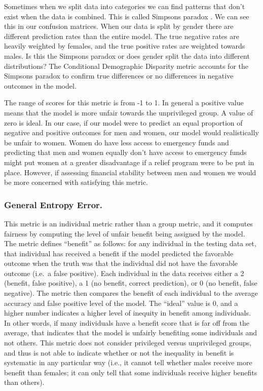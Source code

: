 \documentclass[water,article,submit,moreauthors,pdftex]{mdpi}
\begin{document}
Sometimes when we split data into categories we can find patterns that
don't exist when the data is combined. This is called Simpsons paradox
\citep{mehrabi2021survey}. We can see this in our confusion matrices.
When our data is split by gender there are different prediction rates
than the entire model. The true negative rates are heavily weighted by
females, and the true positive rates are weighted towards males. Is this
the Simpsons paradox or does gender split the data into different
distributions? The Conditional Demographic Disparity metric accounts for
the Simpsons paradox to confirm true differences or no differences in
negative outcomes in the model.

The range of scores for this metric is from -1 to 1. In general a
positive value means that the model is more unfair towards the
unprivileged group. A value of zero is ideal. In our case, if our model
were to predict an equal proportion of negative and positive outcomes
for men and women, our model would realistically be unfair to women.
Women do have less access to emergency funds and predicting that men and
women equally don't have access to emergency funds might put women at a
greater disadvantage if a relief program were to be put in place.
However, if assessing financial stability between men and women we would
be more concerned with satisfying this metric.

\hypertarget{general-entropy-error.}{%
\subsubsection{General Entropy Error.}\label{general-entropy-error.}}

This metric is an individual metric rather than a group metric, and it
computes fairness by computing the level of unfair benefit being
assigned by the model. The metric defines ``benefit'' as follows: for
any individual in the testing data set, that individual has received a
benefit if the model predicted the favorable outcome when the truth was
that the individual did not have the favorable outcome (i.e.~a false
positive). Each individual in the data receives either a 2 (benefit,
false positive), a 1 (no benefit, correct prediction), or 0 (no benefit,
false negative). The metric then compares the benefit of each individual
to the average accuracy and false positive level of the model. The
``ideal'' value is 0, and a higher number indicates a higher level of
inequity in benefit among individuals. In other words, if many
individuals have a benefit score that is far off from the average, that
indicates that the model is unfairly benefiting some individuals and not
others. This metric does not consider privileged versus unprivileged
groups, and thus is not able to indicate whether or not the inequality
in benefit is systematic in any particular way (i.e., it cannot tell
whether males receive more benefit than females; it can only tell that
some individuals receive higher benefits than
others)\citep{caton2020fairness, kypraiou_what_2021}.
\end{document}
